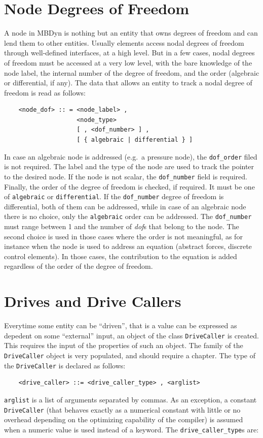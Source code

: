 \documentclass[10pt,dvips]{report}
\begin{document}
\section{Node Degrees of Freedom}
A node in MBDyn is nothing but an entity that owns degrees of freedom and
can lend them to other entities. 
Usually elements access nodal degrees of freedom through well-defined
interfaces, at a high level. 
But in a few cases, nodal degrees of freedom must be accessed
at a very low level, with the bare knowledge of the node label,
the internal number of the degree of freedom, and the order 
(algebraic or differential, if any).
The data that allows an entity to track a nodal degree of freedom is read as
follows:
\begin{verbatim}
    <node_dof> :: = <node_label> , 
                    <node_type> 
                    [ , <dof_number> ] ,
                    [ { algebraic | differential } ]
\end{verbatim}
In case an algebraic node is addressed (e.g.\ a pressure node), 
the {\tt dof\_order} filed is not required.
The label and the type of the node are used to track the pointer to the
desired node. 
If the node is not scalar, the {\tt dof\_number} field is required.
Finally, the order of the degree of freedom is checked, if required.
It must be one of {\tt algebraic} or {\tt differential}.
If the {\tt dof\_number} degree of freedom is differential, both
of them can be addressed, while in case of an algebraic node there is no
choice, only the {\tt algebraic} order can be addressed.
The {\tt dof\_number} must range between 1 and the number of {\em dof}s that
belong to the node.
The second choice is used in those cases where the order is not meaningful,
as for instance when the node is used to address an equation (abstract
forces, discrete control elements). 
In those cases, the contribution to the equation is added regardless 
of the order of the degree of freedom.

\section{Drives and Drive Callers}
Everytime some entity can be ``driven'', that is a value can be
expressed as depedent on some ``external'' input, an object of the class 
{\tt DriveCaller} is created. This requires the input of the properties of
such an object. 
The family of the {\tt DriveCaller} object is very populated, 
and should require a chapter.
The type of the {\tt DriveCaller} is declared as follows:
\begin{verbatim}
    <drive_caller> ::= <drive_caller_type> , <arglist>
\end{verbatim}    
{\tt arglist} is a list of arguments separated by commas.
As an exception, a constant {\tt DriveCaller} (that behaves exactly as a
numerical constant with little or no overhead depending on the optimizing
capability of the compiler) is assumed when a numeric value is used instead
of a keyword.
The {\tt drive\_caller\_type}s are:
\end{document}
